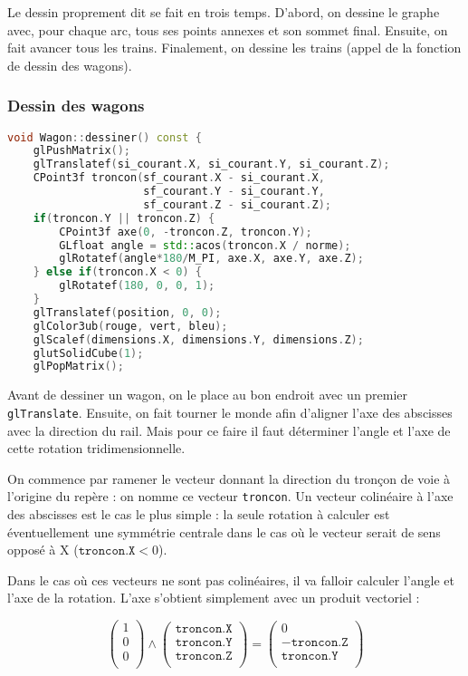 \documentclass[a4paper, oneside, 11pt, twocolumn]{article}
\begin{document}
Le dessin proprement dit se fait en trois temps. D'abord, on dessine le graphe avec, pour chaque arc, tous ses points annexes et son sommet final. Ensuite, on fait avancer tous les trains. Finalement, on dessine les trains (appel de la fonction de dessin des wagons).

\subsubsection{Dessin des wagons}
\label{dessinWagon}

\begin{lstlisting}[language=C++, float=*htb, caption={Dessin d'un wagon}, label=LdessinWagon, basicstyle=\small]
void Wagon::dessiner() const {
    glPushMatrix();
    glTranslatef(si_courant.X, si_courant.Y, si_courant.Z);
    CPoint3f troncon(sf_courant.X - si_courant.X,
                     sf_courant.Y - si_courant.Y,
                     sf_courant.Z - si_courant.Z);
    if(troncon.Y || troncon.Z) {
        CPoint3f axe(0, -troncon.Z, troncon.Y);
        GLfloat angle = std::acos(troncon.X / norme);
        glRotatef(angle*180/M_PI, axe.X, axe.Y, axe.Z);
    } else if(troncon.X < 0) {
        glRotatef(180, 0, 0, 1);
    }
    glTranslatef(position, 0, 0);
    glColor3ub(rouge, vert, bleu);
    glScalef(dimensions.X, dimensions.Y, dimensions.Z);
    glutSolidCube(1);
    glPopMatrix();
\end{lstlisting}

Avant de dessiner un wagon, on le place au bon endroit avec un premier \texttt{glTranslate}. Ensuite, on fait tourner le monde afin d'aligner l'axe des abscisses avec la direction du rail. Mais pour ce faire il faut déterminer l'angle et l'axe de cette rotation tridimensionnelle.

On commence par ramener le vecteur donnant la direction du tronçon de voie à l'origine du repère : on nomme ce vecteur \texttt{troncon}. Un vecteur colinéaire à l'axe des abscisses est le cas le plus simple : la seule rotation à calculer est éventuellement une symmétrie centrale dans le cas où le vecteur serait de sens opposé à X ($\mathtt{troncon.X} < 0$).

Dans le cas où ces vecteurs ne sont pas colinéaires, il va falloir calculer l'angle et l'axe de la rotation. L'axe s'obtient simplement avec un produit vectoriel :

$$
\begin{pmatrix}
  1\\
  0\\
  0\\
\end{pmatrix}
\wedge
\begin{pmatrix}
  \mathtt{troncon.X}\\
  \mathtt{troncon.Y}\\
  \mathtt{troncon.Z}\\
\end{pmatrix}
=
\begin{pmatrix}
  0\\
  -\mathtt{troncon.Z}\\
  \mathtt{troncon.Y}\\
\end{pmatrix}
$$
\end{document}
